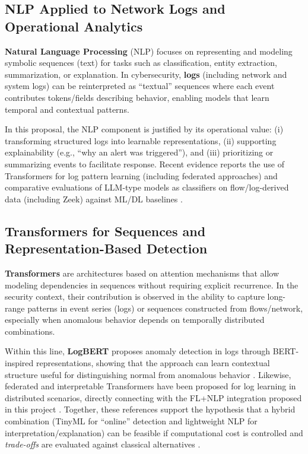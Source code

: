 \subsection{NLP Applied to Network Logs and Operational Analytics}
\textbf{Natural Language Processing} (NLP) focuses on representing and modeling symbolic sequences (text) for tasks such as classification, entity extraction, summarization, or explanation. In cybersecurity, \textbf{logs} (including network and system logs) can be reinterpreted as ``textual'' sequences where each event contributes tokens/fields describing behavior, enabling models that learn temporal and contextual patterns.

\newline
\newline
In this proposal, the NLP component is justified by its operational value: (i) transforming structured logs into learnable representations, (ii) supporting explainability (e.g., ``why an alert was triggered''), and (iii) prioritizing or summarizing events to facilitate response. Recent evidence reports the use of Transformers for log pattern learning (including federated approaches) \cite{Parra2022NDSS,Guo2021LogBERT} and comparative evaluations of LLM-type models as classifiers on flow/log-derived data (including Zeek) against ML/DL baselines \cite{Mehavilla2025}.

\subsection{Transformers for Sequences and Representation-Based Detection}
\textbf{Transformers} are architectures based on attention mechanisms that allow modeling dependencies in sequences without requiring explicit recurrence. In the security context, their contribution is observed in the ability to capture long-range patterns in event series (logs) or sequences constructed from flows/network, especially when anomalous behavior depends on temporally distributed combinations.

\newline
\newline
Within this line, \textbf{LogBERT} proposes anomaly detection in logs through BERT-inspired representations, showing that the approach can learn contextual structure useful for distinguishing normal from anomalous behavior \cite{Guo2021LogBERT}. Likewise, federated and interpretable Transformers have been proposed for log learning in distributed scenarios, directly connecting with the FL+NLP integration proposed in this project \cite{Parra2022NDSS}. Together, these references support the hypothesis that a hybrid combination (TinyML for ``online'' detection and lightweight NLP for interpretation/explanation) can be feasible if computational cost is controlled and \textit{trade-offs} are evaluated against classical alternatives \cite{Mehavilla2025,Tekin2023}.


